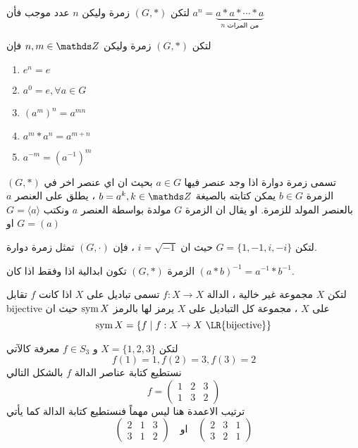 \begin{definition}
	لتكن $(G, *)$ زمرة وليكن $n$ عدد موجب فأن 
	$a^n =\underbrace{a*a*\cdots*a}_{\text{$n$ من المرات}}$ 
\end{definition}

\begin{theorem}
	لتكن $(G, *)$ زمرة وليكن $n, m\in \Z$ فإن
	\setLR
	\begin{enumerate}[label=$\boxed{\arabic*}$]
		\item $e^n =e$
		\item $a^0 =e, \forall a\in G$
		\item $(a^m)^n = a^{mn}$
		\item $a^m * a^n = a^{m+n}$
		\item $a^{-m} = (a^{-1})^m$
	\end{enumerate}
\end{theorem}

\begin{definition}
	$(G, *)$ تسمى زمرة دوارة اذا وجد عنصر فيها $a\in G$ بحيث ان اي عنصر اخر في الزمرة $b\in G$ يمكن كتابته بالصيغة $b =a^k , k \in \Z$ ، يطلق على العنصر $a$ بالعنصر المولد للزمرة. او يقال ان الزمرة $G$ مولدة بواسطة العنصر $a$ ونكتب $G= \langle a\rangle$ او $G=(a)$
 \end{definition}

\begin{example}
	لتكن $G=\{1,-1,i,-i\}$ حيث ان $i = \sqrt{-1}$ ، فإن $(G, \cdot)$ تمثل زمرة دوارة.
\end{example}

\begin{theorem}
	الزمرة $(G, *)$ تكون ابدالية اذا وفقط اذا كان $(a*b)^{-1} = a^{-1} * b^{-1}$.
\end{theorem}


\begin{definition}
	لتكن $X$ مجموعة غير خالية ، الدالة $f:X\to X$ تسمى تباديل على $X$ اذا كانت $f$ تقابل
	bijective	 على $X$ ، مجموعة كل التباديل على $X$ يرمز لها بالرمز $\operatorname{sym}{X}$ حيث ان 
	\[
	\sym{X} = \{ f\mid f:X\to X \,\,\text{\LR{bijective}}\}
	\]
\end{definition}

\begin{example}
	لتكن $X=\{1,2,3\}$ و $f \in S_3$ معرفة كالآتي
	\[
	f(1)=1, f(2)=3, f(3)=2
	\]
	نستطيع كتابة عناصر الدالة $f$ بالشكل التالي
	\[
	f = \begin{pmatrix}
		1&2&3\\
		1&3&2
	\end{pmatrix}
	\]
	ترتيب الاعمدة هنا ليس مهماً فنستطيع كتابة الدالة كما يأتي
	\[
	\begin{pmatrix}
		2&1&3\\
		3&1&2
	\end{pmatrix} \quad \text{او} \quad 
	\begin{pmatrix}
		2&3&1\\
		3&2&1
	\end{pmatrix}
	\]
\end{example}

